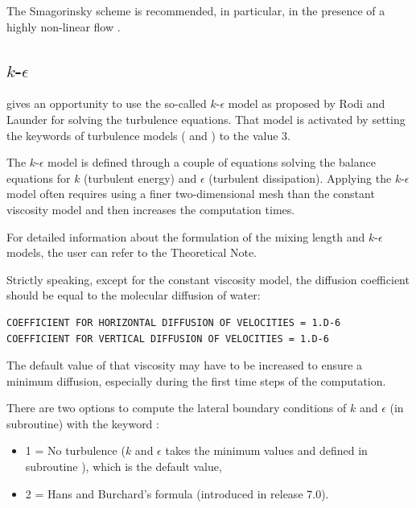 The Smagorinsky scheme is recommended, in particular, in the presence of a
highly non-linear flow \cite{Smagorinsky1963}.


\subsection{$k$-$\epsilon$}

 gives an opportunity to use the so-called $k$-$\epsilon$
model as proposed by Rodi and Launder for solving the turbulence equations.
That model is activated by setting the keywords of turbulence models
( and )
to the value 3.

The $k$-$\epsilon$ model is defined through a couple of equations
solving the balance equations for $k$ (turbulent energy) and $\epsilon$
(turbulent dissipation). Applying the $k$-$\epsilon$ model often
requires using a finer two-dimensional mesh than the constant viscosity model
and then increases the computation times.

For detailed information about the formulation of the mixing length and
$k$-$\epsilon$ models, the user can refer to the  Theoretical
Note.

Strictly speaking, except for the constant viscosity model, the diffusion
coefficient should be equal to the molecular diffusion of water:

\begin{lstlisting}[language=TelemacCas]
COEFFICIENT FOR HORIZONTAL DIFFUSION OF VELOCITIES = 1.D-6
COEFFICIENT FOR VERTICAL DIFFUSION OF VELOCITIES = 1.D-6
\end{lstlisting}

The default value of that viscosity may have to be increased to ensure a minimum
diffusion, especially during the first time steps of the computation.

There are two options to compute the lateral boundary conditions of $k$ and
$\epsilon$ (in  subroutine) with the keyword
:
\begin{itemize}
\item 1 = No turbulence ($k$ and $\epsilon$ takes the minimum values
 and  defined in subroutine ),
which is the default value,
\item 2 = Hans and Burchard’s formula (introduced in release 7.0).
\end{itemize}

